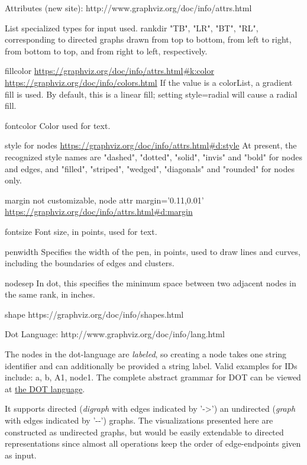 \documentclass[a4paper, 12pt, bibliography=totoc]{scrartcl}
\begin{document}
Attributes (new site): http://www.graphviz.org/doc/info/attrs.html

List specialized types for input used.
rankdir "TB", "LR", "BT", "RL", corresponding to directed graphs drawn from top to bottom, from left to right, from bottom to top, and from right to left, respectively. 

fillcolor  \url{https://graphviz.org/doc/info/attrs.html#k:color} \url{https://graphviz.org/doc/info/colors.html} 
If the value is a colorList, a gradient fill is used. By default, this is a linear fill; setting style=radial will cause a radial fill. 

fontcolor Color used for text. 

style for nodes \url{https://graphviz.org/doc/info/attrs.html#d:style}
At present, the recognized style names are "dashed", "dotted", "solid", "invis" and "bold" for nodes and edges,  and "filled", "striped", "wedged", "diagonals" and "rounded" for nodes only.


margin not customizable, node attr margin='0.11,0.01' \url{https://graphviz.org/doc/info/attrs.html#d:margin}

fontsize Font size, in points, used for text. 


penwidth Specifies the width of the pen, in points, used to draw lines and curves, including the boundaries of edges and clusters. 

nodesep In dot, this specifies the minimum space between two adjacent nodes in the same rank, in inches. 

shape https://graphviz.org/doc/info/shapes.html


Dot Language: http://www.graphviz.org/doc/info/lang.html

The nodes in the dot-language are \emph{labeled}, so creating a node takes one string identifier and
can additionally be provided a string label. Valid examples for IDs include: a, b, A1, node1.
The complete abstract grammar for DOT can be viewed at \href{https://graphviz.gitlab.io/_pages/doc/info/lang.html}{the DOT language}.

It supports directed (\textit{digraph} with edges indicated by '->') an undirected (\textit{graph} with edges indicated by '-{}-') graphs.
The visualizations presented here are constructed as undirected graphs, but would be easily extendable to directed representations since almost all operations keep the order of edge-endpoints given as input.
\end{document}
